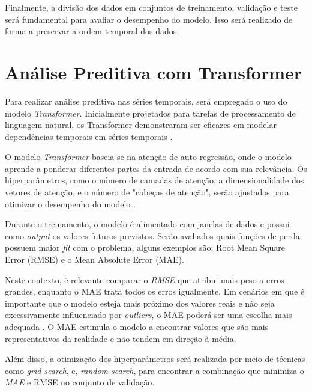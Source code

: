 Finalmente, a divisão dos dados em conjuntos de treinamento, validação e teste será fundamental para avaliar o desempenho do modelo. Isso será realizado de forma a preservar a ordem temporal dos dados.

\section{Análise Preditiva com Transformer}

Para realizar análise preditiva nas séries temporais, será empregado o uso do modelo \textit{Transformer}. Inicialmente projetados para tarefas de processamento de linguagem natural, os Transformer demonstraram ser eficazes em modelar dependências temporais em séries temporais \cite{lim2019temporal}.

O modelo \textit{Transformer} baseia-se na atenção de auto-regressão, onde o modelo aprende a ponderar diferentes partes da entrada de acordo com sua relevância. Os hiperparâmetros, como o número de camadas de atenção, a dimensionalidade dos vetores de atenção, e o número de "cabeças de atenção", serão ajustados para otimizar o desempenho do modelo \cite{vaswani2017attention}.

Durante o treinamento, o modelo é alimentado com janelas de dados e possui como \textit{output} os  valores futuros previstos. Serão avaliados quais funções de perda possuem maior \textit{fit}  com o problema, alguns exemplos são: Root Mean Square Error (RMSE) e o Mean Absolute Error (MAE).

Neste contexto, é relevante comparar o \textit{RMSE} que atribui mais peso a erros grandes, enquanto o MAE trata todos os erros igualmente. Em cenários em que é importante que o modelo esteja mais próximo dos valores reais e não seja excessivamente influenciado por \textit{outliers}, o MAE poderá ser uma escolha mais adequada \cite{willmott2005advantages}. O MAE estimula o modelo a encontrar valores que são mais representativos da realidade e não tendem em direção à média.

Além disso, a otimização dos hiperparâmetros será realizada por meio de técnicas como \textit{grid search}, e, \textit{random search}, para encontrar a combinação que minimiza o \textit{MAE}  e RMSE no conjunto de validação. 